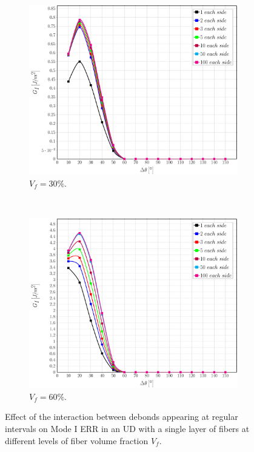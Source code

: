 \documentclass[review]{elsarticle}
\begin{document}
\begin{figure}[!h]
\centering
    \begin{subfigure}[b]{0.475\textwidth}
        \includegraphics[width=\textwidth]{sidefibers-vf30-GI.pdf}
        \caption{$V_{f}=30\%$.}\label{subfig:sidefiber30MI}
    \end{subfigure} ~
    \begin{subfigure}[b]{0.475\textwidth}
        \includegraphics[width=\textwidth]{sidefibers-vf60-GI.pdf}
        \caption{$V_{f}=60\%$.}\label{subfig:sidefiber60MI}
    \end{subfigure}

\caption{Effect of the interaction between debonds appearing at regular intervals on Mode I ERR in an UD with a single layer of fibers at different levels of fiber volume fraction $V_{f}$.}\label{fig:sidefibersMI}
\end{figure}
\end{document}

